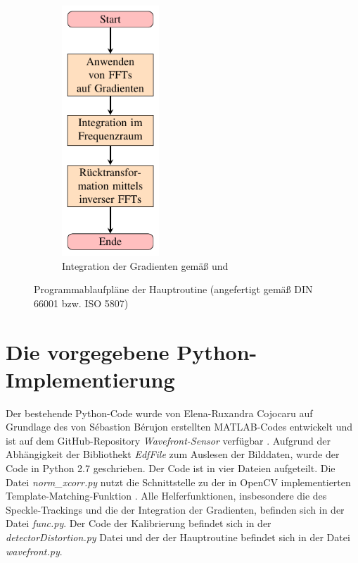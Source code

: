 \begin{figure}[htbp]
\begin{subfigure}[b]{0.45\textwidth}
		\includegraphics[width=0.4\textwidth]{pdf/graph_fc}
		\caption[Frankot-Chellappa]{Integration der Gradienten gemäß \cite{FC88} und \cite{Kov04}}
		\label{fig:graph_fc}
	\end{subfigure}
	\caption[Algorithmen]{Programmablaufpläne der Hauptroutine (angefertigt gemäß DIN 66001 bzw. ISO 5807)}
\end{figure}

\section{Die vorgegebene Python-Implementierung}

Der bestehende Python-Code wurde von Elena-Ruxandra Cojocaru auf Grundlage des von Sébastion Bérujon erstellten MATLAB-Codes entwickelt und ist auf dem GitHub-Repository \textit{Wavefront-Sensor} verfügbar \cite{Coj17}. Aufgrund der Abhängigkeit der Bibliothekt \textit{EdfFile} zum Auslesen der Bilddaten, wurde der Code in Python 2.7 geschrieben. Der Code ist in vier Dateien aufgeteilt. Die Datei \textit{norm\_xcorr.py} nutzt die Schnittstelle zu der in OpenCV implementierten Template-Matching-Funktion \cite{SA17}. Alle Helferfunktionen, insbesondere die des Speckle-Trackings und die der Integration der Gradienten, befinden sich in der Datei \textit{func.py}. Der Code der Kalibrierung befindet sich in der \textit{detectorDistortion.py} Datei und der der Hauptroutine befindet sich in der Datei \textit{wavefront.py}. 

